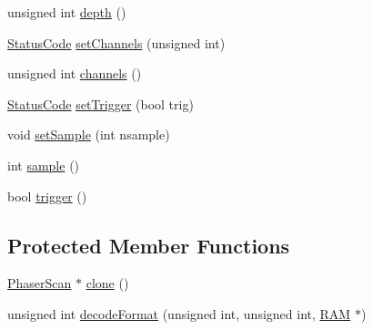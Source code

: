 \begin{DoxyCompactItemize}
unsigned int \hyperlink{classPhaserScan_ad2d47975431e765c906ba51eeeb4365d}{depth} ()
\item 
\hyperlink{classStatusCode}{Status\+Code} \hyperlink{classPhaserScan_a12fc9ff050fc15e067ae622c37827661}{set\+Channels} (unsigned int)
\item 
unsigned int \hyperlink{classPhaserScan_ae3752906e17afd1f7ee5f62a08711871}{channels} ()
\item 
\hyperlink{classStatusCode}{Status\+Code} \hyperlink{classPhaserScan_a8e9d2bff400546f71d0c24cd3658d09e}{set\+Trigger} (bool trig)
\item 
void \hyperlink{classPhaserScan_ae66b02455c6d5779ba92d3a17abd7ead}{set\+Sample} (int nsample)
\item 
int \hyperlink{classPhaserScan_a278292fe5bc31814dab8cd54deb76b48}{sample} ()
\item 
bool \hyperlink{classPhaserScan_a6ae0b3511064540555ef9770c63febc4}{trigger} ()
\end{DoxyCompactItemize}
\subsection*{Protected Member Functions}
\begin{DoxyCompactItemize}
\item 
\hyperlink{classPhaserScan}{Phaser\+Scan} $\ast$ \hyperlink{classPhaserScan_a4c842f4bda17fb8907c51efc0ccb9d43}{clone} ()
\item 
unsigned int \hyperlink{classPhaserScan_ad01a0ce0223859a138e3a78023a924bb}{decode\+Format} (unsigned int, unsigned int, \hyperlink{classRAM}{R\+AM} $\ast$)
\end{DoxyCompactItemize}
